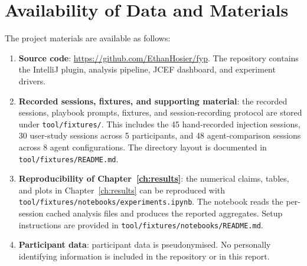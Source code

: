 \section{Availability of Data and Materials}
\label{sec:declarations-availability}

The project materials are available as follows:

\begin{enumerate}
  \item \textbf{Source code}: \url{https://github.com/EthanHosier/fyp}. The repository contains the IntelliJ plugin, analysis pipeline, JCEF dashboard, and experiment drivers.
  \item \textbf{Recorded sessions, fixtures, and supporting material}: the recorded sessions, playbook prompts, fixtures, and session-recording protocol are stored under \texttt{tool/fixtures/}. This includes the 45 hand-recorded injection sessions, 30 user-study sessions across 5 participants, and 48 agent-comparison sessions across 8 agent configurations. The directory layout is documented in \texttt{tool/fixtures/README.md}. 
  \item \textbf{Reproducibility of Chapter~\ref{ch:results}}: the numerical claims, tables, and plots in Chapter~\ref{ch:results} can be reproduced with \texttt{tool/fixtures/notebooks/experiments.ipynb}. The notebook reads the per-session cached analysis files and produces the reported aggregates. Setup instructions are provided in \texttt{tool/fixtures/notebooks/README.md}.
  \item \textbf{Participant data}: participant data is pseudonymised. No personally identifying information is included in the repository or in this report.
\end{enumerate}
